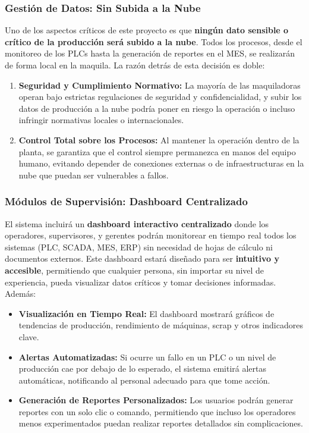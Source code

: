 \documentclass[
  10pt,
  letterpaper,
]{book}
\providecommand{\tightlist}{%
  \setlength{\itemsep}{0pt}\setlength{\parskip}{0pt}}\usepackage{longtable,booktabs,array}
\begin{document}
\subsubsection{Gestión de Datos: Sin Subida a la
Nube}\label{gestiuxf3n-de-datos-sin-subida-a-la-nube}

Uno de los aspectos críticos de este proyecto es que \textbf{ningún dato
sensible o crítico de la producción será subido a la nube}. Todos los
procesos, desde el monitoreo de los PLCs hasta la generación de reportes
en el MES, se realizarán de forma local en la maquila. La razón detrás
de esta decisión es doble:

\begin{enumerate}
\def\labelenumi{\arabic{enumi}.}
\item
  \textbf{Seguridad y Cumplimiento Normativo:} La mayoría de las
  maquiladoras operan bajo estrictas regulaciones de seguridad y
  confidencialidad, y subir los datos de producción a la nube podría
  poner en riesgo la operación o incluso infringir normativas locales o
  internacionales.
\item
  \textbf{Control Total sobre los Procesos:} Al mantener la operación
  dentro de la planta, se garantiza que el control siempre permanezca en
  manos del equipo humano, evitando depender de conexiones externas o de
  infraestructuras en la nube que puedan ser vulnerables a fallos.
\end{enumerate}

\subsubsection{Módulos de Supervisión: Dashboard
Centralizado}\label{muxf3dulos-de-supervisiuxf3n-dashboard-centralizado}

El sistema incluirá un \textbf{dashboard interactivo centralizado} donde
los operadores, supervisores, y gerentes podrán monitorear en tiempo
real todos los sistemas (PLC, SCADA, MES, ERP) sin necesidad de hojas de
cálculo ni documentos externos. Este dashboard estará diseñado para ser
\textbf{intuitivo y accesible}, permitiendo que cualquier persona, sin
importar su nivel de experiencia, pueda visualizar datos críticos y
tomar decisiones informadas. Además:

\begin{itemize}
\tightlist
\item
  \textbf{Visualización en Tiempo Real:} El dashboard mostrará gráficos
  de tendencias de producción, rendimiento de máquinas, scrap y otros
  indicadores clave.
\item
  \textbf{Alertas Automatizadas:} Si ocurre un fallo en un PLC o un
  nivel de producción cae por debajo de lo esperado, el sistema emitirá
  alertas automáticas, notificando al personal adecuado para que tome
  acción.
\item
  \textbf{Generación de Reportes Personalizados:} Los usuarios podrán
  generar reportes con un solo clic o comando, permitiendo que incluso
  los operadores menos experimentados puedan realizar reportes
  detallados sin complicaciones.
\end{itemize}
\end{document}

